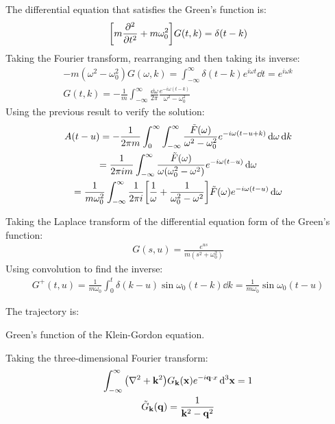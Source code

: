\documentclass{report}
\begin{document}
\begin{subquests}
\begin{subquests}
		\item The differential equation that satisfies the Green's function is:
		\begin{gather*}
			\bqty{m\pdv[2]{t} + m\omega_0^2}G(t,k) = \delta(t- k)
		\end{gather*}
		Taking the Fourier transform, rearranging and then taking its inverse:
		\begin{gather*}
			-m(\omega^2 - \omega_0^2)G(\omega,k) = \int_{-\infty}^{\infty} \delta(t - k) e^{i\omega t} \dd{t} = e^{i\omega k} \\
			G(t,k) = -\frac{1}{m}\int_{-\infty}^{\infty}\frac{\dd{\omega}}{2\pi}\frac{e^{-i\omega(t-k)}}{\omega^2 - \omega_0^2} 
		\end{gather*}
		Using the previous result to verify the solution:
		\begin{gather*}
			A(t-u) = -\frac{1}{2\pi m}\int_0^{\infty}\int_{-\infty}^{\infty}\frac{\tilde F(\omega)}{\omega^2 - \omega_0^2}e^{-i\omega(t-u + k)}\dd{\omega}\dd{k} \\
			=  \frac{1}{2\pi i m}\int_{-\infty}^{\infty}\frac{\tilde F(\omega)}{\omega(\omega_0^2 - \omega^2)}e^{-i\omega(t-u)}\dd{\omega} \\ = \frac{1}{m\omega_0^2}\int_{-\infty}^{\infty}\frac{1}{2\pi i}\bqty{\frac{1}{\omega} + \frac{1}{\omega_0^2 - \omega^2}}\tilde F(\omega)e^{-i\omega(t-u)} \dd{\omega}
		\end{gather*}

		\item Taking the Laplace transform of the differential equation form of the Green's function:
		\begin{gather*}
			G(s,u) = \frac{e^{us}}{m(s^2 + \omega_0^2)}
		\end{gather*}
		Using convolution to find the inverse:
		\begin{gather*}
			G^+(t,u) = \frac{1}{m\omega_0}\int_0^{t} \delta(k-u) \sin \omega_0(t - k) \dd{k}  = \frac{1}{m\omega_0}\sin\omega_0(t-u)
		\end{gather*}

		\item The trajectory is:
	\end{subquests}
	
	\item Green's function of the Klein-Gordon equation.
	\begin{subquests}
		\item Taking the three-dimensional Fourier transform:
		\begin{gather*}
			\int_{-\infty}^{\infty} \pqty{\nabla^2 + \mathbf k^2}G_{\mathbf k}(\mathbf x)e^{-i\vb q\cdot x}\,\dd^3{\vb x} = 1 \\
			\tilde G_{\mathbf k}(\mathbf q) = \frac{1}{\mathbf k^2 - \mathbf q^2}
		\end{gather*}
		

\end{subquests}
\end{subquests}
\end{document}
